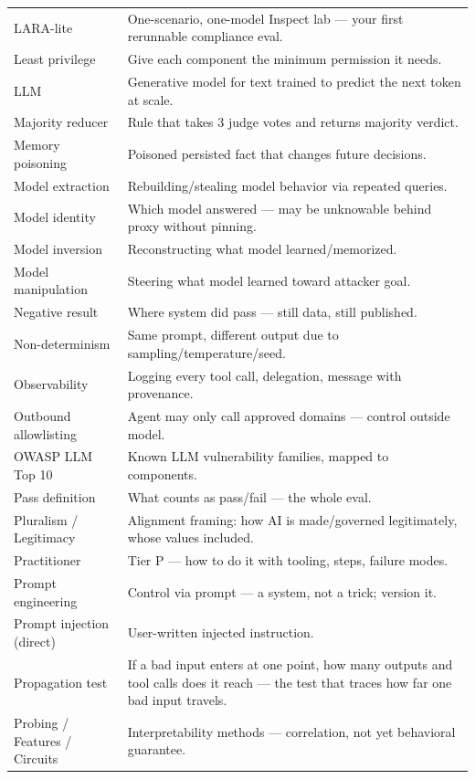 \begin{center}
\begin{tabularx}{\linewidth}{lX}
LARA-lite & One-scenario, one-model Inspect lab — your first rerunnable compliance eval. \\
Least privilege & Give each component the minimum permission it needs. \\
LLM & Generative model for text trained to predict the next token at scale. \\
Majority reducer & Rule that takes 3 judge votes and returns majority verdict. \\
Memory poisoning & Poisoned persisted fact that changes future decisions. \\
Model extraction & Rebuilding/stealing model behavior via repeated queries. \\
Model identity & Which model answered — may be unknowable behind proxy without pinning. \\
Model inversion & Reconstructing what model learned/memorized. \\
Model manipulation & Steering what model learned toward attacker goal. \\
Negative result & Where system did pass — still data, still published. \\
Non-determinism & Same prompt, different output due to sampling/temperature/seed. \\
Observability & Logging every tool call, delegation, message with provenance. \\
Outbound allowlisting & Agent may only call approved domains — control outside model. \\
OWASP LLM Top 10 & Known LLM vulnerability families, mapped to components. \\
Pass definition & What counts as pass/fail — the whole eval. \\
Pluralism / Legitimacy & Alignment framing: how AI is made/governed legitimately, whose values included. \\
Practitioner & Tier P — how to do it with tooling, steps, failure modes. \\
Prompt engineering & Control via prompt — a system, not a trick; version it. \\
Prompt injection (direct) & User-written injected instruction. \\
Propagation test & If a bad input enters at one point, how many outputs and tool calls does it reach — the test that traces how far one bad input travels. \\
Probing / Features / Circuits & Interpretability methods — correlation, not yet behavioral guarantee. \\

\end{tabularx}
\end{center}
